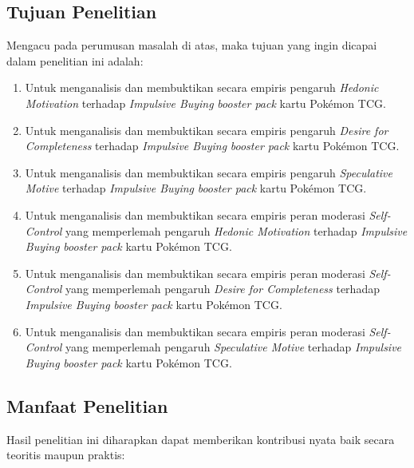 \documentclass[12pt,a4paper]{article}
\numberwithin{equation}{section}
\numberwithin{table}{section}
\numberwithin{figure}{section}
\begin{document}
\subsection{Tujuan Penelitian}

Mengacu pada perumusan masalah di atas, maka tujuan yang ingin dicapai dalam penelitian ini adalah:
\begin{enumerate}
  \item Untuk menganalisis dan membuktikan secara empiris pengaruh \emph{Hedonic Motivation} terhadap \emph{Impulsive Buying} \emph{booster pack} kartu Pok\'emon TCG.
  \item Untuk menganalisis dan membuktikan secara empiris pengaruh \emph{Desire for Completeness} terhadap \emph{Impulsive Buying} \emph{booster pack} kartu Pok\'emon TCG.
  \item Untuk menganalisis dan membuktikan secara empiris pengaruh \emph{Speculative Motive} terhadap \emph{Impulsive Buying} \emph{booster pack} kartu Pok\'emon TCG.
  \item Untuk menganalisis dan membuktikan secara empiris peran moderasi \emph{Self-Control} yang memperlemah pengaruh \emph{Hedonic Motivation} terhadap \emph{Impulsive Buying} \emph{booster pack} kartu Pok\'emon TCG.
  \item Untuk menganalisis dan membuktikan secara empiris peran moderasi \emph{Self-Control} yang memperlemah pengaruh \emph{Desire for Completeness} terhadap \emph{Impulsive Buying} \emph{booster pack} kartu Pok\'emon TCG.
  \item Untuk menganalisis dan membuktikan secara empiris peran moderasi \emph{Self-Control} yang memperlemah pengaruh \emph{Speculative Motive} terhadap \emph{Impulsive Buying} \emph{booster pack} kartu Pok\'emon TCG.
\end{enumerate}

\subsection{Manfaat Penelitian}

Hasil penelitian ini diharapkan dapat memberikan kontribusi nyata baik secara teoritis maupun praktis:
\end{document}
